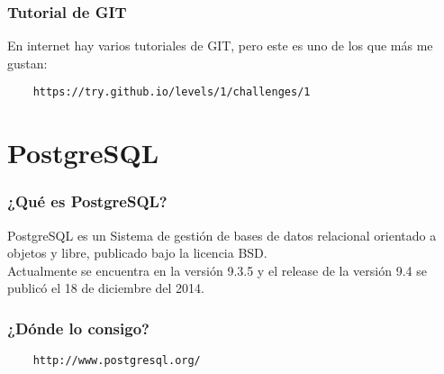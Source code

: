 \documentclass{beamer}
\begin{document}
\begin{frame}[fragile]
  \frametitle{Tutorial de GIT}
  En internet hay varios tutoriales de GIT, pero este es uno de los que más me
  gustan:
  \begin{verbatim}
    https://try.github.io/levels/1/challenges/1
  \end{verbatim}
\end{frame}

\section{PostgreSQL}

\begin{frame}
  \frametitle{¿Qué es PostgreSQL?}
  PostgreSQL es un Sistema de gestión de bases de datos relacional orientado a
  objetos y libre, publicado bajo la licencia BSD.\\
  Actualmente se encuentra en la versión 9.3.5 y el release de la versión 9.4
  se publicó el 18 de diciembre del 2014.
\end{frame}

\begin{frame}[fragile]
  \frametitle{¿Dónde lo consigo?}
  \begin{verbatim}
    http://www.postgresql.org/
  \end{verbatim}
\end{frame}
\end{document}
